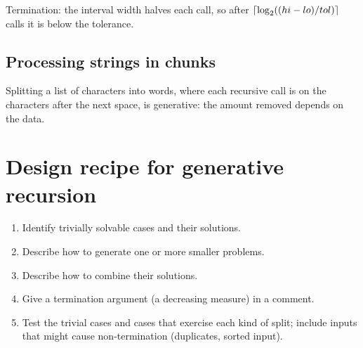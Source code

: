 \begin{center}
\end{center}

Termination: the interval width halves each call, so after
$\left\lceil \log_2((hi-lo)/tol) \right\rceil$ calls it is below the tolerance.

\subsection{Processing strings in chunks}
Splitting a list of characters into words, where each recursive call is on
the characters after the next space, is generative: the amount removed depends
on the data.

\section{Design recipe for generative recursion}
\begin{enumerate}
  \item Identify trivially solvable cases and their solutions.
  \item Describe how to generate one or more smaller problems.
  \item Describe how to combine their solutions.
  \item Give a termination argument (a decreasing measure) in a comment.
  \item Test the trivial cases and cases that exercise each kind of split; include inputs that might cause non-termination (duplicates, sorted input).
\end{enumerate}

